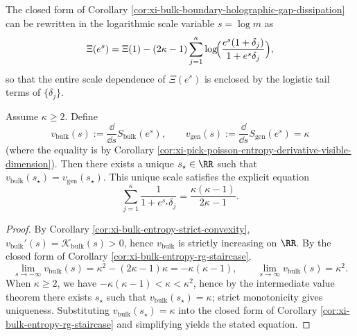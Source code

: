 \begin{remark}\label{rem:xi-holographic-gap-closed-trajectory}
The closed form of Corollary \ref{cor:xi-bulk-boundary-holographic-gap-dissipation} can be rewritten in the logarithmic scale variable \(s=\log m\) as
\[
\Xi(e^s)
=\Xi(1)-(2\kappa-1)\sum_{j=1}^{\kappa}\log\!\Bigl(\frac{e^{s}(1+\delta_j)}{1+e^{s}\delta_j}\Bigr),
\]
so that the entire scale dependence of \(\Xi(e^s)\) is enclosed by the logistic tail terms of \(\{\delta_j\}\).
\end{remark}

\begin{proposition}\label{prop:xi-bulk-boundary-speed-matching}
Assume \(\kappa\ge 2\).
Define
\[
v_{\mathrm{bulk}}(s):=\frac{\dd}{\dd s}S_{\mathrm{bulk}}(e^s),
\qquad
v_{\mathrm{gen}}(s):=\frac{\dd}{\dd s}S_{\mathrm{gen}}(e^s)=\kappa
\]
(where the equality is by Corollary \ref{cor:xi-pick-poisson-entropy-derivative-visible-dimension}).
Then there exists a unique \(s_\star\in\RR\) such that \(v_{\mathrm{bulk}}(s_\star)=v_{\mathrm{gen}}(s_\star)\).
This unique scale satisfies the explicit equation
\[
\boxed{\;
\sum_{j=1}^{\kappa}\frac{1}{1+e^{s_\star}\delta_j}=\frac{\kappa(\kappa-1)}{2\kappa-1}.\;}
\]
\end{proposition}
\begin{proof}
By Corollary \ref{cor:xi-bulk-entropy-strict-convexity}, \(v_{\mathrm{bulk}}'(s)=\mathcal{K}_{\mathrm{bulk}}(s)>0\), hence \(v_{\mathrm{bulk}}\) is strictly increasing on \(\RR\).
By the closed form of Corollary \ref{cor:xi-bulk-entropy-rg-staircase},
\[
\lim_{s\to-\infty}v_{\mathrm{bulk}}(s)=\kappa^2-(2\kappa-1)\kappa=-\kappa(\kappa-1),
\qquad
\lim_{s\to\infty}v_{\mathrm{bulk}}(s)=\kappa^2.
\]
When \(\kappa\ge 2\), we have \(-\kappa(\kappa-1)<\kappa<\kappa^2\), hence by the intermediate value theorem there exists \(s_\star\) such that \(v_{\mathrm{bulk}}(s_\star)=\kappa\); strict monotonicity gives uniqueness.
Substituting \(v_{\mathrm{bulk}}(s_\star)=\kappa\) into the closed form of Corollary \ref{cor:xi-bulk-entropy-rg-staircase} and simplifying yields the stated equation.
\end{proof}

